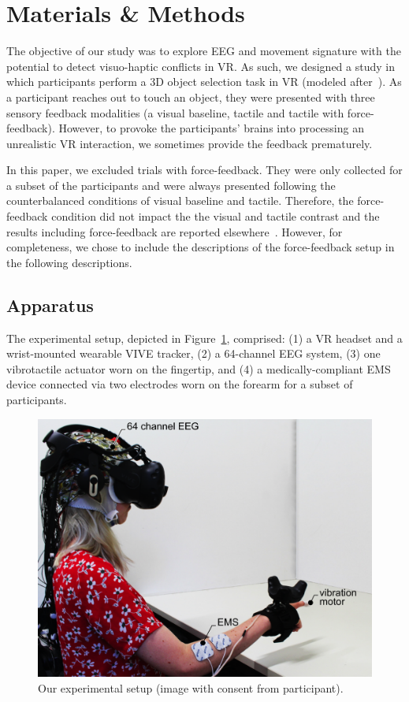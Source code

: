 \section{Materials \& Methods}
The objective of our study was to explore EEG and movement signature with the potential to detect visuo-haptic conflicts in VR. As such, we designed a study in which participants perform a 3D object selection task in VR (modeled after~\cite{singh_visual_2018}). As a participant reaches out to touch an object, they were presented with three sensory feedback modalities (a visual baseline, tactile and tactile with force-feedback). However, to provoke the participants' brains into processing an unrealistic VR interaction, we sometimes provide the feedback prematurely. 

In this paper, we excluded trials with force-feedback. They were only collected for a subset of the participants and were always presented following the counterbalanced conditions of visual baseline and tactile. Therefore, the force-feedback condition did not impact the the visual and tactile contrast and the results including force-feedback are reported elsewhere~\cite{Gehrke2018}. However, for completeness, we chose to include the descriptions of the force-feedback setup in the following descriptions.

\subsection{Apparatus}
The experimental setup, depicted in Figure~\ref{setup}, comprised: (1) a VR headset and a wrist-mounted wearable VIVE tracker, (2) a 64-channel EEG system, (3) one vibrotactile actuator worn on the fingertip, and (4) a medically-compliant EMS device connected via two electrodes worn on the forearm for a subset of participants.

\begin{figure}[!ht]
\includegraphics[width=\linewidth]{figures/experiment.pdf}
\caption{Our experimental setup (image with consent from participant).}
\label{setup}
\end{figure}

